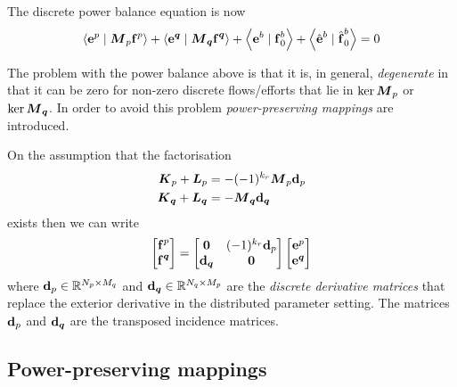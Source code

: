 The discrete power balance equation is now
\begin{equation}
  \dualityform{\dcovectr{e}^{p}}{\matr{M}_{p}\dcovectr{f}^{p}}{}+
  \dualityform{\dcovectr{e}^{\covectr{q}}}{\matr{M}_{\covectr{q}}\dcovectr{f}^{\covectr{q}}}{}+
  \dualityform{\dcovectr{e}^{b}}{\dcovectr{f}^{b}_{0}}{}+
  \dualityform{\hat{\dcovectr{e}}^{b}}{\hat{\dcovectr{f}}^{b}_{0}}{}=0
\end{equation}

The problem with the power balance above is that it is, in general,
\emph{degenerate} in that it can be zero for non-zero discrete flows/efforts
that lie in $\kernel{\matr{M}_{p}}$ or $\kernel{\matr{M}_{\covectr{q}}}$. In
order to avoid this problem \emph{power-preserving mappings} are introduced.

On the assumption that the factorisation
\begin{align}
  \matr{K}_{p}+\matr{L}_{p}&=-(-1)^{k_{r}}\matr{M}_{p}\dcovectr{d}_{p}\\
  \matr{K}_{\covectr{q}}+\matr{L}_{\covectr{q}}&=-\matr{M}_{\covectr{q}}\dcovectr{d}_{\covectr{q}}
\end{align}
exists then we can write
\begin{equation}
  \begin{bmatrix}
     \boldsymbol{\mathrm{f}} ^{p} \\
     \boldsymbol{\mathrm{f}} ^{ \boldsymbol{q} }
  \end{bmatrix} = \begin{bmatrix}
     \boldsymbol{\mathrm{0}}  & (-1)^{k_{r}} \boldsymbol{\mathrm{d}} _{p} \\
     \boldsymbol{\mathrm{d}} _{ \boldsymbol{q} } &  \boldsymbol{\mathrm{0}} 
  \end{bmatrix} \begin{bmatrix}
     \boldsymbol{\mathrm{e}} ^{p} \\
     \boldsymbol{\mathrm{e}} ^{ \boldsymbol{q} }
  \end{bmatrix}
\end{equation}
where $\dcovectr{d}_{p}\in\rntopology{N_{p}\times M_{q}}$ and
$\dcovectr{d}_{\covectr{q}}\in\rntopology{N_{q}\times M_{p}}$ are the
\emph{discrete derivative matrices} that replace the exterior derivative in
the distributed parameter setting. The matrices $ \boldsymbol{\mathrm{d}} _{p}$ and
$ \boldsymbol{\mathrm{d}} _{ \boldsymbol{q} }$ are the transposed incidence matrices.

\subsection{Power-preserving mappings}

